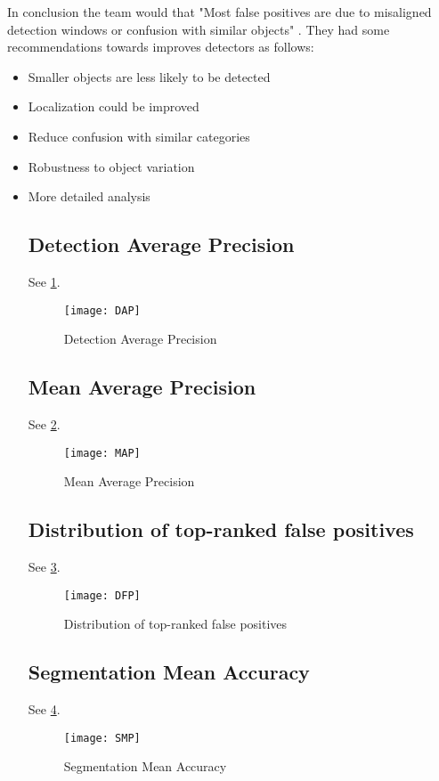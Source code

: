 In conclusion the team would that "Most false positives are due to misaligned
detection windows or confusion with similar objects"
\textcite{diagnosingErrors}. They had some recommendations towards improves
detectors as follows:
\begin{itemize}
	\item{Smaller objects are less likely to be detected}
	\item{Localization could be improved}
	\item{Reduce confusion with similar categories}
	\item{Robustness to object variation}
	\item{More detailed analysis}
\subsection{Detection Average Precision}
See \ref{fig:dap}.
\begin{figure}
	\texttt{[image: DAP]}
	\caption{Detection Average Precision \textcite{donahue}}
    \label{fig:dap}
\end{figure}

\subsection{Mean Average Precision}
See \ref{fig:MAP}.
		\begin{figure}
			\texttt{[image: MAP]}
			\caption{Mean Average Precision \textcite{donahue}}
			\label{fig:MAP}
		\end{figure}
		
\subsection{Distribution of top-ranked false positives}
See \ref{fig:DFP}.
		\begin{figure}
			\texttt{[image: DFP]}
			\caption{Distribution of top-ranked false positives \textcite{donahue}}
			\label{fig:DFP}
		\end{figure}
		

\subsection{Segmentation Mean Accuracy}
See \ref{fig:SMP}.
		\begin{figure}
			\texttt{[image: SMP]}
			\caption{Segmentation Mean Accuracy \textcite{donahue}}
			\label{fig:SMP}
		\end{figure}
		


\end{itemize}
